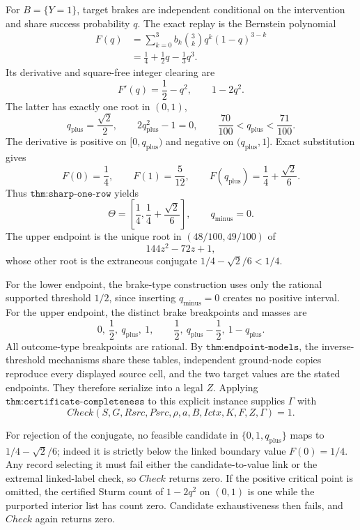 For \(B=\{Y=1\}\), target brakes are independent conditional on the intervention and share success probability \(q\).  The exact replay is the Bernstein polynomial
\[
 \begin{aligned}
 F(q)
 &=\sum_{k=0}^{3}b_k\binom3kq^k(1-q)^{3-k}\\
 &=\frac14+\frac12q-\frac13q^3.
 \end{aligned}
\]
Its derivative and square-free integer clearing are
\[
 F'(q)=\frac12-q^2,
 \qquad 1-2q^2.
\]
The latter has exactly one root in \((0,1)\),
\[
 q_{\mathrm{plus}}=\frac{\sqrt2}{2},
 \qquad 2q_{\mathrm{plus}}^2-1=0,
 \qquad \frac{70}{100}<q_{\mathrm{plus}}<\frac{71}{100}.
\]
The derivative is positive on \([0,q_{\mathrm{plus}})\) and negative on \((q_{\mathrm{plus}},1]\).  Exact substitution gives
\[
 F(0)=\frac14,
 \qquad F(1)=\frac5{12},
 \qquad F(q_{\mathrm{plus}})=\frac14+\frac{\sqrt2}{6}.
\]
Thus \(\texttt{thm:sharp-one-row}\) yields
\[
 \Theta=\left[\frac14,\frac14+\frac{\sqrt2}{6}\right],
 \qquad q_{\mathrm{minus}}=0.
\]
The upper endpoint is the unique root in \((48/100,49/100)\) of
\[
 144z^2-72z+1,
\]
whose other root is the extraneous conjugate \(1/4-\sqrt2/6<1/4\).

For the lower endpoint, the brake-type construction uses only the rational supported threshold \(1/2\), since inserting \(q_{\mathrm{minus}}=0\) creates no positive interval.  For the upper endpoint, the distinct brake breakpoints and masses are
\[
 0,\ \frac12,\ q_{\mathrm{plus}},\ 1,
 \qquad
 \frac12,\ q_{\mathrm{plus}}-\frac12,\ 1-q_{\mathrm{plus}}.
\]
All outcome-type breakpoints are rational.  By \(\texttt{thm:endpoint-models}\), the inverse-threshold mechanisms share these tables, independent ground-node copies reproduce every displayed source cell, and the two target values are the stated endpoints.  They therefore serialize into a legal \(Z\).  Applying \(\texttt{thm:certificate-completeness}\) to this explicit instance supplies \(\Gamma\) with
\[
 Check(S,G,Rsrc,Psrc,\rho,a,B,Ictx,K,F,Z,\Gamma)=1.
\]

For rejection of the conjugate, no feasible candidate in \(\{0,1,q_{\mathrm{plus}}\}\) maps to \(1/4-\sqrt2/6\); indeed it is strictly below the linked boundary value \(F(0)=1/4\).  Any record selecting it must fail either the candidate-to-value link or the extremal linked-label check, so \(Check\) returns zero.  If the positive critical point is omitted, the certified Sturm count of \(1-2q^2\) on \((0,1)\) is one while the purported interior list has count zero.  Candidate exhaustiveness then fails, and \(Check\) again returns zero.

